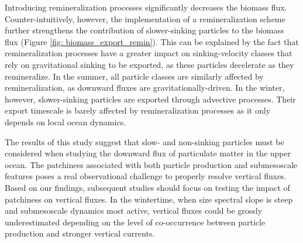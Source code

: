 \documentclass[article,linenumbers]{agujournal2018}
\begin{document}
	Introducing remineralization processes significantly decreases the biomass flux. Counter-intuitively, however, the implementation of a remineralization scheme further strengthens the contribution of slower-sinking particles to the biomass flux (Figure \ref{fig: biomass_export_remin}). This can be explained by the fact that remineralization processes have a greater impact on sinking-velocity classes that rely on gravitational sinking to be exported, as these particles decelerate as they remineralize. In the summer, all particle classes are similarly affected by remineralization, as downward fluxes are gravitationally-driven. In the winter, however, slower-sinking particles are exported through advective processes. Their export timescale is barely affected by remineralization processes as it only depends on local ocean dynamics.
	
	The results of this study suggest that slow- and non-sinking particles must be considered when studying the downward flux of particulate matter in the upper ocean. The patchiness associated with both particle production and submesoscale features poses a real observational challenge to properly resolve vertical fluxes. Based on our findings, subsequent studies should focus on testing the impact of patchiness on vertical fluxes. In the wintertime, when size spectral slope is steep and submesoscale dynamics most active, vertical fluxes could be grossly underestimated depending on the level of co-occurrence between particle production and stronger vertical currents.
	
\end{document}
